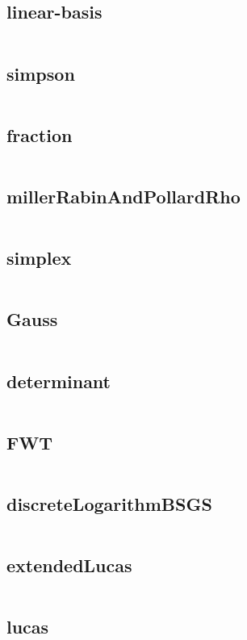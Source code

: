   \subsection{linear-basis}
    \inputminted{cpp}{../code/math/linear-basis.cpp}
  \subsection{simpson}
    \inputminted{cpp}{../code/math/simpson.cpp}
  \subsection{fraction}
    \inputminted{cpp}{../code/math/fraction.cpp}
  \subsection{millerRabinAndPollardRho}
    \inputminted{cpp}{../code/math/millerRabinAndPollardRho.cpp}
  \subsection{simplex}
    \inputminted{cpp}{../code/math/simplex.cpp}
  \subsection{Gauss}
    \inputminted{cpp}{../code/math/Gauss.cpp}
  \subsection{determinant}
    \inputminted{cpp}{../code/math/determinant.cpp}
  \subsection{FWT}
    \inputminted{cpp}{../code/math/FWT.cpp}
  \subsection{discreteLogarithmBSGS}
    \inputminted{cpp}{../code/math/discreteLogarithmBSGS.cpp}
  \subsection{extendedLucas}
    \inputminted{cpp}{../code/math/extendedLucas.cpp}
  \subsection{lucas}
    \inputminted{cpp}{../code/math/lucas.cpp}
